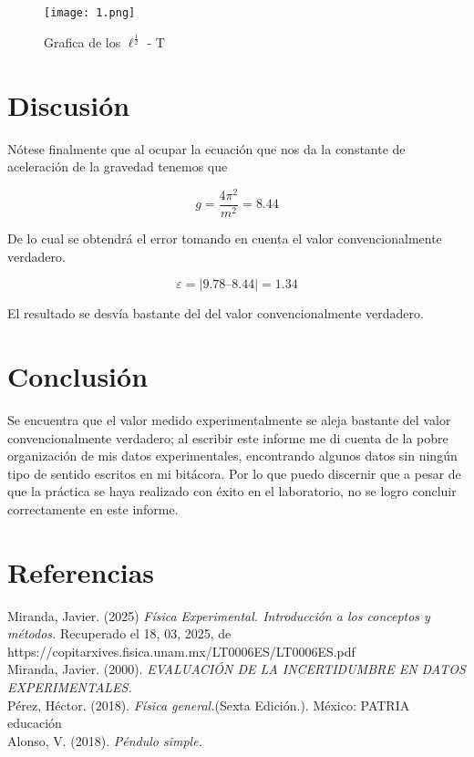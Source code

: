 \documentclass[12pt,a4paper]{article}
\begin{document}
\begin{figure}[h!]
\centering
\texttt{[image: 1.png]}
\caption{Grafica de los $\ell^{\frac{1}{2}}$ - T}
\end{figure}

\newpage

\section{Discusión}

Nótese finalmente que al ocupar la ecuación que nos da la constante de aceleración de la gravedad tenemos que 

\[g = \frac{4\pi^2}{m^2} = 8.44\]

De lo cual se obtendrá el error tomando en cuenta el valor convencionalmente verdadero.

\[\varepsilon = |9.78 – 8.44| = 1.34\]

El resultado se desvía bastante del del valor convencionalmente verdadero. 

\section{Conclusión}

Se encuentra que el valor medido experimentalmente se aleja bastante del valor convencionalmente verdadero; al escribir este informe me di cuenta de la pobre organización de mis datos experimentales, encontrando algunos datos sin ningún tipo de sentido escritos en mi bitácora. Por lo que puedo discernir que a pesar de que la práctica se haya realizado con éxito en el laboratorio, no se logro concluir correctamente en este informe.  


\section{Referencias}

Miranda, Javier. (2025) \textit{Física Experimental. Introducción a los conceptos y métodos.} Recuperado el 18, 03, 2025, de https://copitarxives.fisica.unam.mx/LT0006ES/LT0006ES.pdf \\

Miranda, Javier. (2000). \textit{EVALUACIÓN DE LA INCERTIDUMBRE EN DATOS EXPERIMENTALES.} \\

Pérez, Héctor. (2018). \textit{Física general.}(Sexta Edición.). México: PATRIA educación \\

Alonso, V. (2018). \textit{Péndulo simple.}
\end{document}
